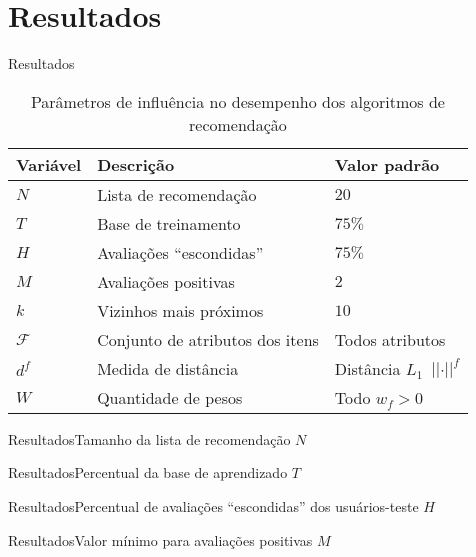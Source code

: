 \section[Resultados]{Resultados}

\begin{frame}{Resultados}
\begin{table}[hp]
\begin{center}
    \caption{Parâmetros de influência no desempenho dos algoritmos de recomendação}\vspace{-.5cm}
    \label{tab:variaveis}
    \begin{tabular}{  | p{1.5cm} | p{5.5cm} | p{3.0cm} | } 
    \hline
    \textbf{Variável} & \textbf{Descrição} & \textbf{Valor padrão}  \\ \hline
    $N$ & Lista de recomendação & $20$ \\ \hline   
    $T$ & Base de treinamento & $75\%$ \\ \hline
    $H$ & Avaliações ``escondidas'' & $75\%$ \\ \hline
    $M$ & Avaliações positivas & $2$ \\ \hline
    $k$ & Vizinhos mais próximos & $10$ \\ \hline
    $\mathcal{F}$ & Conjunto de atributos dos itens & Todos atributos \\ \hline
    $d^f$ & Medida de distância & Distância $L_1$~$\left|\left|\cdot\right|\right|^f$ \\ \hline
    $W$ & Quantidade de pesos & Todo $w_f>0$ \\ \hline
    \end{tabular}
\end{center}
\end{table}
\end{frame}

\begin{frame}{Resultados}{Tamanho da lista de recomendação $N$}
\end{frame}

\begin{frame}{Resultados}{Percentual da base de aprendizado $T$}
\end{frame}

\begin{frame}{Resultados}{Percentual de avaliações ``escondidas'' dos usuários-teste $H$}
\end{frame}

\begin{frame}{Resultados}{Valor mínimo para avaliações positivas $M$}
\end{frame}


